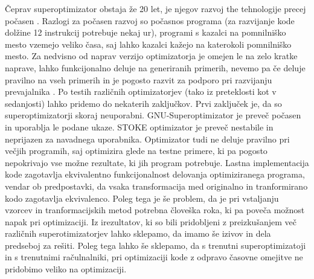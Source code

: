 \documentclass[a4paper, 12pt]{book}
\begin{document}
Čeprav superoptimizator obstaja že 20 let, je njegov razvoj the tehnologije precej počasen \cite{pdf4}. Razlogi za počasen razvoj so počasnos programa (za razvijanje kode dolžine 12 instrukcij potrebuje nekaj ur), programi s kazalci na pomnilniško mesto vzemejo veliko časa, saj lahko kazalci kažejo na katerokoli pomnilniško mesto. Za nedvisno od naprav verzijo optimizatorja je omejen le na zelo kratke naprave, lahko funkcijonalno deluje na generiranih primerih, nevemo pa če deluje pravilno na vseh primerih in je pogosto razvit za podporo pri razvijanju prevajalnika \cite{razlog}. Po testih različnih optimizatorjev (tako iz preteklosti kot v sedanjosti) lahko pridemo do nekaterih zaključkov. Prvi zaključek je, da so superoptimizatorji skoraj neuporabni. GNU-Superoptimizator je preveč počasen in uporablja le podane ukaze. STOKE optimizator je preveč nestabile in neprijazen za navadnega uporabnika. Optimizator tudi ne deluje pravilno pri večjih programih, saj optimizira glede na testne primere, ki pa pogosto nepokrivajo vse možne rezultate, ki jih program potrebuje. Lastna implementacija kode zagotavlja ekvivalentno funkcijonalnost delovanja optimiziranega programa, vendar ob predpostavki, da vsaka transformacija med originalno in tranformirano kodo zagotavlja ekvivalenco. Poleg tega je še problem, da je pri vstaljanju vzorcev in tranformacijskih metod potrebna človeška roka, ki pa poveča možnost napak pri optimizaciji. Iz irezultatov, ki so bili pridobljeni z preizkušanjem več različnih superotimizatorjev lahko sklepamo, da imamo še izivov in dela predseboj za rešiti. Poleg tega lahko še sklepamo, da s trenutni superoptimizatoji in s trenutnimi račulnalniki, pri optimizaciji kode z odpravo časovne omejitve ne pridobimo veliko na optimizaciji. 
\ \\
\newpage

\clearpage  
{}


\end{document}
